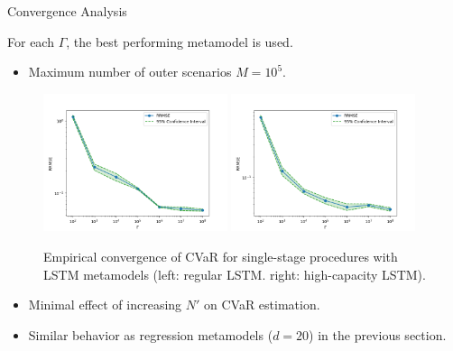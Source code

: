 \documentclass[9pt,handout]{beamer}
\begin{document}
\begin{frame}{Convergence Analysis}

    For each $\Gamma$, the best performing metamodel is used.

    \begin{itemize}
        \item   Maximum number of outer scenarios $M = 10^5$.
    \end{itemize}

    \begin{figure}[ht!]
        \centering
        \includegraphics[width=0.48\textwidth]{../project2/figures/singleStage/MSEConvergence_lstmLoCap.png}
        \includegraphics[width=0.48\textwidth]{../project2/figures/singleStage/MSEConvergence_lstmHiCap.png}
        \caption{Empirical convergence of CVaR for single-stage procedures with LSTM metamodels (left: regular LSTM. right: high-capacity LSTM).}
    \end{figure}

    \begin{itemize}
        \item   Minimal effect of increasing $N'$ on CVaR estimation.
        \item   Similar behavior as regression metamodels ($d=20$) in the previous section.
    \end{itemize}

\end{frame}
\end{document}
